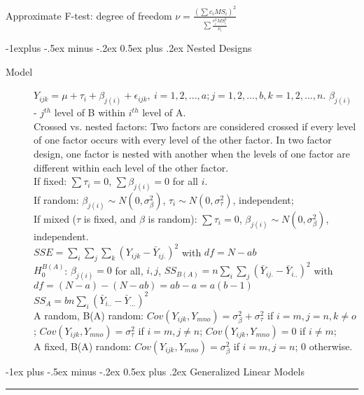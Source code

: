 \documentclass[10pt,landscape]{article}
\makeatletter
\renewcommand{\section}{\@startsection{section}{1}{0mm}%
                                {-1ex plus -.5ex minus -.2ex}%
                                {0.5ex plus .2ex}%
                                {\normalfont\large\bfseries}}
\renewcommand{\subsection}{\@startsection{subsection}{2}{0mm}%
                                {-1explus -.5ex minus -.2ex}%
                                {0.5ex plus .2ex}%
                                {\normalfont\normalsize\bfseries}}
\makeatother
\begin{document}
\begin{multicols}{3}
\begin{description}
Approximate F-test: degree of freedom $\nu = \frac{(\sum c_i MS_i)^2}{\sum \frac{c_i^2 MS_i^2}{\nu_i}}$
\end{description}

\subsection{Nested Designs}

\begin{description}
\item[Model] $Y_{ijk} = \mu + \tau_i + \beta_{j(i)} +  \epsilon_{ijk},\ i = 1,2,...,a; j = 1, 2,...,b, k= 1,2,...,n$. $\beta_{j(i)}$ - $j^{th}$ level of B within $i^{th}$ level of A. \\
Crossed vs. nested factors: Two factors are considered crossed if every level of one factor occurs with every level of the other factor. In two factor design, one factor is nested with another when the levels of one factor are different within each level of the other factor. \\
If fixed: $\sum \tau_i = 0$, $\sum \beta_{j(i)} = 0$ for all $i$.\\
If random: $\beta_{j(i)} \sim N(0, \sigma_{\beta}^2)$, $\tau_i \sim N(0, \sigma_{\tau}^2)$, independent;\\
If mixed ($\tau$ is fixed, and $\beta$ is random): $\sum \tau_i = 0$, $\beta_{j(i)} \sim N(0, \sigma_{\beta}^2)$, independent.\\
$SSE = \sum_i \sum_j \sum_k (Y_{ijk} - \bar{Y}_{ij.})^2$ with $df = N-ab$\\
$H_0^{B(A)}$: $\beta_{j(i)} =0$ for all, $i, j$, $SS_{B(A)} = n\sum_i \sum_j (\bar{Y}_{ij.} - \bar{Y}_{i..})^2$ with $df = (N-a) - (N-ab) = ab-a = a(b-1)$ \\
$SS_A = bn\sum_i (\bar{Y}_{i..} - \bar{Y}_{...})^2$ \\
A random, B(A) random: $Cov(Y_{ijk}, Y_{mno}) = \sigma_\beta^2 + \sigma_\tau^2$ if $i=m, j=n, k\neq o$; $Cov(Y_{ijk}, Y_{mno}) =  \sigma_\tau^2$ if $i=m, j\neq n$; $Cov(Y_{ijk}, Y_{mno}) = 0$ if $i\neq m$; \\
A fixed, B(A) random: $Cov(Y_{ijk}, Y_{mno}) = \sigma_\beta^2 $ if $i=m, j=n$; $0$ otherwise.
\end{description}

\section{Generalized Linear Models}\smallskip \hrule height 2pt \smallskip

\end{multicols}
\end{document}
